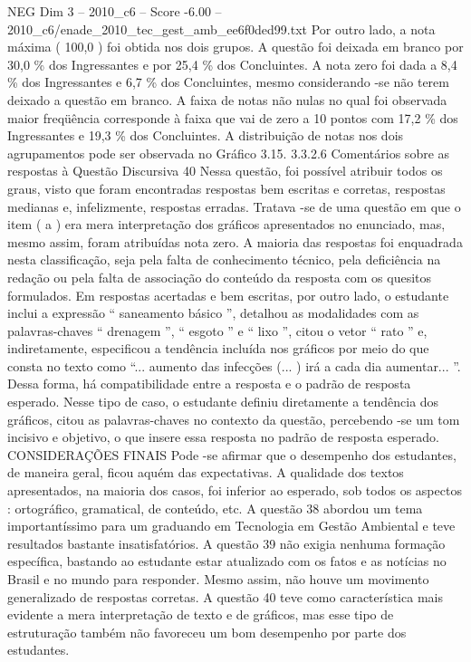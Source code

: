 \begin{textsample}{NEG Dim 3 – 2010\_c6 – Score -6.00 – 2010\_c6/enade\_2010\_tec\_gest\_amb\_ee6f0ded99.txt}
Por outro lado, a nota máxima ( 100,0 ) foi obtida nos dois grupos.
A questão foi deixada em branco por 30,0 \% dos Ingressantes e por 25,4 \% dos Concluintes.
A nota zero foi dada a 8,4 \% dos Ingressantes e 6,7 \% dos Concluintes, mesmo considerando -se não terem deixado a questão em branco.
A faixa de notas não nulas no qual foi observada maior freqüência corresponde à faixa que vai de zero a 10 pontos com 17,2 \% dos Ingressantes e 19,3 \% dos Concluintes.
A distribuição de notas nos dois agrupamentos pode ser observada no Gráfico 3.15. 3.3.2.6 Comentários sobre as respostas à Questão Discursiva 40 Nessa questão, foi possível atribuir todos os graus, visto que foram encontradas respostas bem escritas e corretas, respostas medianas e, infelizmente, respostas erradas.
Tratava -se de uma questão em que o item ( a ) era mera interpretação dos gráficos apresentados no enunciado, mas, mesmo assim, foram atribuídas nota zero.
A maioria das respostas foi enquadrada nesta classificação, seja pela falta de conhecimento técnico, pela deficiência na redação ou pela falta de associação do conteúdo da resposta com os quesitos formulados.
Em respostas acertadas e bem escritas, por outro lado, o estudante inclui a expressão “ saneamento básico ”, detalhou as modalidades com as palavras-chaves “ drenagem ”, “ esgoto ” e “ lixo ”, citou o vetor “ rato ” e, indiretamente, especificou a tendência incluída nos gráficos por meio do que consta no texto como “... aumento das infecções (... ) irá a cada dia aumentar... ”.
Dessa forma, há compatibilidade entre a resposta e o padrão de resposta esperado.
Nesse tipo de caso, o estudante definiu diretamente a tendência dos gráficos, citou as palavras-chaves no contexto da questão, percebendo -se um tom incisivo e objetivo, o que insere essa resposta no padrão de resposta esperado.
CONSIDERAÇÕES FINAIS Pode -se afirmar que o desempenho dos estudantes, de maneira geral, ficou aquém das expectativas.
A qualidade dos textos apresentados, na maioria dos casos, foi inferior ao esperado, sob todos os aspectos : ortográfico, gramatical, de conteúdo, etc.
A questão 38 abordou um tema importantíssimo para um graduando em Tecnologia em Gestão Ambiental e teve resultados bastante insatisfatórios.
A questão 39 não exigia nenhuma formação específica, bastando ao estudante estar atualizado com os fatos e as notícias no Brasil e no mundo para responder.
Mesmo assim, não houve um movimento generalizado de respostas corretas.
A questão 40 teve como característica mais evidente a mera interpretação de texto e de gráficos, mas esse tipo de estruturação também não favoreceu um bom desempenho por parte dos estudantes.

\end{textsample}
